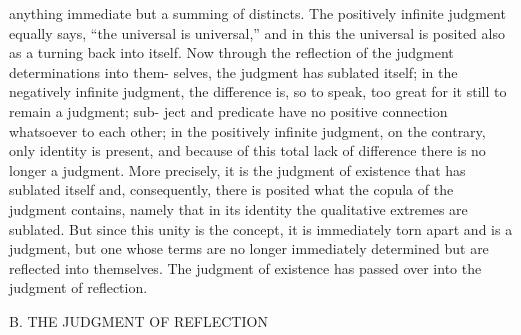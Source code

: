 anything immediate but a summing of distincts. The positively infinite
judgment equally says, “the universal is universal,” and in this the universal
is posited also as a turning back into itself.
Now through the reflection of the judgment determinations into them-
selves, the judgment has sublated itself; in the negatively infinite judgment,
the difference is, so to speak, too great for it still to remain a judgment; sub-
ject and predicate have no positive connection whatsoever to each other; in
the positively infinite judgment, on the contrary, only identity is present,
and because of this total lack of difference there is no longer a judgment.
More precisely, it is the judgment of existence that has sublated itself and,
consequently, there is posited what the copula of the judgment contains,
namely that in its identity the qualitative extremes are sublated. But since
this unity is the concept, it is immediately torn apart and is a judgment, but
one whose terms are no longer immediately determined but are reflected
into themselves. The judgment of existence has passed over into the judgment
of reflection.

B. THE JUDGMENT OF REFLECTION

